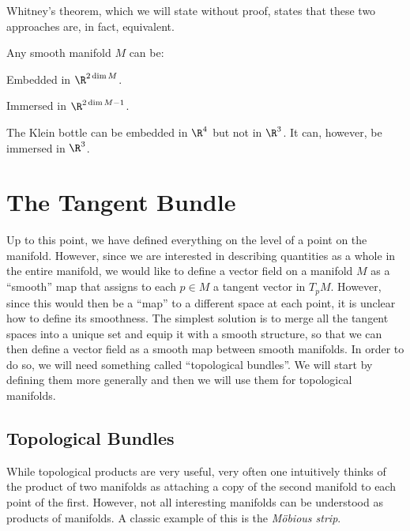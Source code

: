 Whitney's theorem, which we will state without proof, states that these two approaches are, in fact, equivalent.

\bt[Whitney]
Any smooth manifold $M$ can be:
\bit
\item Embedded in $\R^{2\dim M}$.
\item Immersed in $\R^{2\dim M-1}$.
\eit
\et

\be
The Klein bottle can be embedded in $\R^4$ but not in $\R^3$. It can, however, be immersed in $\R^3$.
\ee

\section{The Tangent Bundle}

Up to this point, we have defined everything on the level of a point on the manifold. However, since we are
interested in describing quantities as a whole in the entire manifold, we would like to define a vector field on a
manifold $M$ as a ``smooth'' map that assigns to each $p\in M$ a tangent vector in $T_p M$. However, since this would
then be a ``map'' to a different space at each point, it is unclear how to define its smoothness. The simplest
solution is to merge all the tangent spaces into a unique set and equip it with a smooth structure, so that we can
then define a vector field as a smooth map between smooth manifolds. In order to do so, we will need something called
``topological bundles''. We will start by defining them more generally and then we will use them for topological
manifolds.

\subsection{Topological Bundles}

While topological products are very useful, very often one intuitively thinks of the product of two manifolds as
attaching a copy of the second manifold to each point of the first. However, not all interesting manifolds can be
understood as products of manifolds. A classic example of this is the \emph{Möbious strip}.

\vspace{-0.1cm}

\begin{center}
\end{center}

